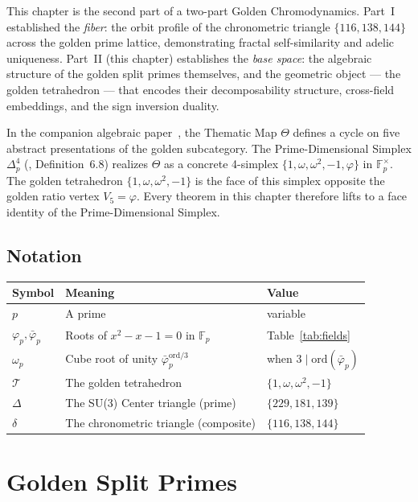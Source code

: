 This chapter is the second part of a two-part Golden Chromodynamics.
Part~I~\cite{dwm_fst} established the \emph{fiber}: the orbit
profile of the chronometric triangle $\{116, 138, 144\}$~\cite{lockwood_chrono} across
the golden prime lattice, demonstrating fractal self-similarity
and adelic uniqueness. Part~II (this chapter) establishes the
\emph{base space}: the algebraic structure of the golden split
primes themselves, and the geometric object --- the golden
tetrahedron --- that encodes their decomposability structure,
cross-field embeddings, and the sign inversion duality.

In the companion algebraic paper~\cite{larue_lc}, the Thematic Map
$\Theta$ defines a cycle on five abstract presentations of the golden
subcategory. The Prime-Dimensional Simplex $\Delta^4_p$
(\cite{larue_lc}, Definition~6.8) realizes $\Theta$ as a concrete
4-simplex $\{1, \omega, \omega^2, -1, \varphi\}$ in $\mathbb{F}_p^\times$.
The golden tetrahedron $\{1, \omega, \omega^2, -1\}$ is the face of
this simplex opposite the golden ratio vertex $V_5 = \varphi$. Every
theorem in this chapter therefore lifts to a face identity of the
Prime-Dimensional Simplex.

\subsection{Notation}

\begin{center}
\begin{tabular}{@{}lll@{}}
\toprule
Symbol & Meaning & Value \\
\midrule
$p$ & A prime & variable \\
$\varphi_p, \bar\varphi_p$ & Roots of $x^2 - x - 1 = 0$ in $\mathbb{F}_p$ & Table~\ref{tab:fields} \\
$\omega_p$ & Cube root of unity $\bar\varphi_p^{\mathrm{ord}/3}$ & when $3 \mid \mathrm{ord}(\bar\varphi_p)$ \\
$\mathcal{T}$ & The golden tetrahedron & $\{1, \omega, \omega^2, -1\}$ \\
$\Delta$ & The SU(3) Center triangle (prime) & $\{229, 181, 139\}$ \\
$\delta$ & The chronometric triangle (composite) & $\{116, 138, 144\}$ \\
\bottomrule
\end{tabular}
\end{center}

\section{Golden Split Primes}
\label{sec:golden}

